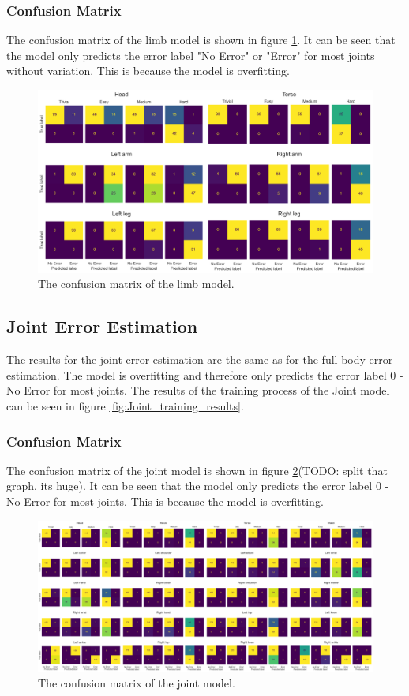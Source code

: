 \subsubsection{Confusion Matrix}

The confusion matrix of the limb model is shown in figure \ref{fig:limb_confusion_matrix}. It can be seen that the model only predicts the error label "No Error" or "Error" for most joints without variation. This is because the model is overfitting.

\begin{figure}
  \centering
  \includegraphics[width=\textwidth]{figures/results/confusion/limbs.png}
  \caption[Limb model confusion matrix]{The confusion matrix of the limb model.}
  \label{fig:limb_confusion_matrix}
\end{figure}

\subsection{Joint Error Estimation}
\label{sec:joint_error_estimation}

The results for the joint error estimation are the same as for the full-body error estimation. The model is overfitting and therefore only predicts the error label $0$ - No Error for most joints. The results of the training process of the Joint model can be seen in figure \ref{fig:Joint_training_results}.

\subsubsection{Confusion Matrix}

The confusion matrix of the joint model is shown in figure \ref{fig:joint_confusion_matrix}(TODO: split that graph, its huge). It can be seen that the model only predicts the error label $0$ - No Error for most joints. This is because the model is overfitting.

\begin{figure}
  \centering
  \includegraphics[width=\textwidth]{figures/results/confusion/joints.png}
  \caption[Joint model confusion matrix]{The confusion matrix of the joint model.}
  \label{fig:joint_confusion_matrix}
\end{figure}